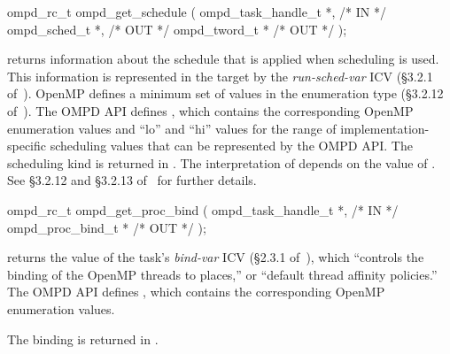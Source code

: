 %
\summary

\format
\ccppspecificstart
\begin{boxedcode}
ompd\_rc\_t ompd\_get\_schedule (
  ompd\_task\_handle\_t        *,                           /* IN */
  ompd\_sched\_t              *,                                 /* OUT */
  ompd\_tword\_t              *                              /* OUT */
); 
\end{boxedcode}
\ccppspecificend

\descr

 returns information about the schedule that is
applied when  scheduling is used.
%
This information is represented in the target by the
\emph{run-sched-var} ICV (\S3.2.1 of~\cite{OpenMP}).
\argdesc
OpenMP defines a minimum set of values in the enumeration type
 (\S3.2.12 of~\cite{OpenMP}).
%
The OMPD API defines
, which contains the
corresponding OpenMP enumeration values and ``lo'' and ``hi'' values
for the range of implementation-specific scheduling values that can be
represented by the OMPD API.
%
The scheduling kind is returned in .
%
The interpretation of  depends on the value of
.
%
See \S3.2.12 and \S3.2.13 of~\cite{OpenMP} for further details.

\crossreferences


%
\summary

\format
\ccppspecificstart
\begin{boxedcode}
ompd\_rc\_t ompd\_get\_proc\_bind (
  ompd\_task\_handle\_t        *,                           /* IN */
  ompd\_proc\_bind\_t          *                                  /* OUT */
); 
\end{boxedcode}
\ccppspecificend

\descr
{} returns the value of the task's
\emph{bind-var} ICV (\S2.3.1 of~\cite{OpenMP}), which ``controls the
binding of the OpenMP threads to places,'' or ``default thread
affinity policies.''
%
The OMPD API defines
, which
contains the corresponding OpenMP enumeration values.
%

\argdesc
The binding is returned in .
%

